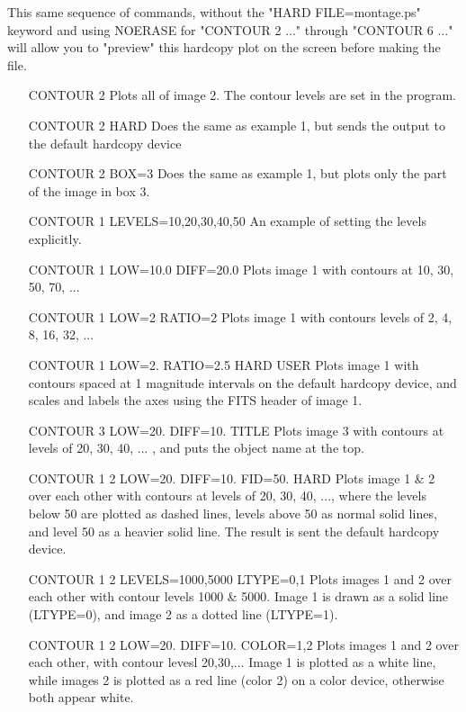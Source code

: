 This same sequence of commands, without the "HARD FILE=montage.ps" keyword
and using NOERASE for "CONTOUR 2 ..." through "CONTOUR 6 ..." will allow
you to "preview" this hardcopy plot on the screen before making the file.
 
\begin{itemize}
  \item[CONTOUR 2\hfill]{
Plots all of image 2.  The contour levels are set in the program.}
  \item[CONTOUR 2 HARD\hfill]{
Does the same as example 1, but sends the output to the default
        hardcopy device}
  \item[CONTOUR 2 BOX=3\hfill]{
Does the same as example 1, but plots only the part of the image in
box 3.}
  \item[CONTOUR 1 LEVELS=10,20,30,40,50\hfill]{
An example of setting the levels explicitly.}
  \item[CONTOUR 1 LOW=10.0 DIFF=20.0\hfill]{
Plots image 1 with contours at 10, 30, 50, 70, ...}
  \item[CONTOUR 1 LOW=2 RATIO=2\hfill]{
Plots image 1 with contours levels of 2, 4, 8, 16, 32, ...}
  \item[CONTOUR 1 LOW=2. RATIO=2.5 HARD USER\hfill]{
Plots image 1 with contours spaced at 1 magnitude intervals on the
default hardcopy device, and scales and labels the axes using the
FITS header of image 1.}
  \item[CONTOUR 3 LOW=20. DIFF=10. TITLE\hfill]{
Plots image 3 with contours at levels of 20, 30, 40, ... , and puts
the object name at the top.}
  \item[CONTOUR 1 2 LOW=20. DIFF=10. FID=50. HARD\hfill]{
        Plots image 1 \& 2 over each other with contours at levels of 20, 30, 
        40, ..., where the levels below 50 are plotted as dashed lines, 
        levels above 50 as normal solid lines, and level 50 as a heavier 
        solid line. The result is sent the default hardcopy device.}
  \item[CONTOUR 1 2 LEVELS=1000,5000 LTYPE=0,1 \hfill]{
        Plots images 1 and 2 over each other with contour levels 1000 \& 5000.
        Image 1 is drawn as a solid line (LTYPE=0), and image 2 as a dotted 
        line (LTYPE=1).}
  \item[CONTOUR 1 2 LOW=20. DIFF=10. COLOR=1,2\hfill]{
Plots images 1 and 2 over each other, with contour levesl 20,30,...
        Image 1 is plotted as a white line, while images 2 is plotted as
        a red line (color 2) on a color device, otherwise both appear white.}

\end{itemize}
